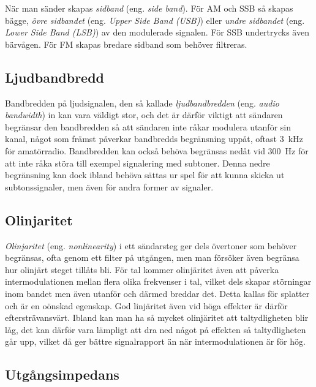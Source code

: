 När man sänder skapas \emph{sidband} (eng. \emph{side band}).
För AM och SSB så skapas bägge, \emph{övre sidbandet}
(eng. \emph{Upper Side Band (USB)}) eller \emph{undre sidbandet}
(eng. \emph{Lower Side Band (LSB)}) av den modulerade signalen.
För SSB undertrycks även bärvågen.
För FM skapas bredare sidband som behöver filtreras.

\subsection{Ljudbandbredd}

Bandbredden på ljudsignalen, den så kallade \emph{ljudbandbredden} (eng.
\emph{audio bandwidth}) in kan vara väldigt stor, och det är därför viktigt
att sändaren begränsar den bandbredden så att sändaren inte råkar modulera
utanför sin kanal, något som främst påverkar bandbredds begränsning uppåt,
oftast 3~kHz för amatörradio.
Bandbredden kan också behöva begränsas nedåt vid 300~Hz för att inte råka
störa till exempel signalering med subtoner.
Denna nedre begränsning kan dock ibland behöva sättas ur spel för att
kunna skicka ut subtonssignaler, men även för andra former av signaler.

\subsection{Olinjaritet}

\emph{Olinjaritet} (eng. \emph{nonlinearity}) i ett sändarsteg ger dels
övertoner som behöver begränsas, ofta genom ett filter på utgången, men man
försöker även begränsa hur olinjärt steget tillåts bli.
För tal kommer olinjäritet även att påverka intermodulationen mellan flera
olika frekvenser i tal, vilket dels skapar störningar inom bandet men även
utanför och därmed breddar det.
Detta kallas för splatter och är en oönskad egenskap.
God linjäritet även vid höga effekter är därför eftersträvansvärt.
Ibland kan man ha så mycket olinjäritet att taltydligheten blir låg, det
kan därför vara lämpligt att dra ned något på effekten så taltydligheten går
upp, vilket då ger bättre signalrapport än när intermodulationen är för hög.

\subsection{Utgångsimpedans}

